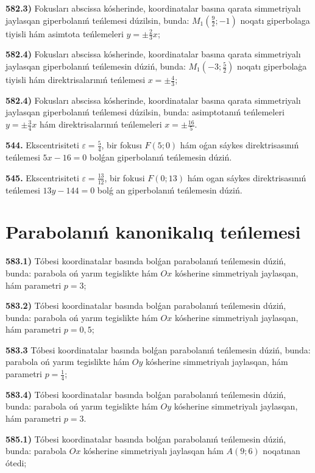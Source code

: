 \textbf{582.3)} Fokusları abscissa kósherinde, koordinatalar basına qarata simmetriyalı jaylasqan giperbolanıń teńlemesi dúzilsin, bunda: $M_1\left(\frac{9}{2};-1\right) $ noqatı giperbolaga tiyisli hám asimtota teńlemeleri $y= \pm \frac{2}{3} x$;

\textbf{582.4)} Fokusları abscissa kósherinde, koordinatalar basına qarata simmetriyalı jaylasqan giperbolanıń teńlemesin dúziń, bunda: $M_1\left(-3; \frac{5}{2}\right)$ noqatı giperbolaģa tiyisli hám direktrisalarınıń teńlemesi $x= \pm \frac{4}{3}$;

\textbf{582.4)} Fokusları abscissa kósherinde, koordinatalar basına qarata simmetriyalı jaylasqan giperbolanıń teńlemesi dúzilsin, bunda: asimptotanıń teńlemeleri $y= \pm \frac{3}{4} x$ hám direktrisalarınıń teńlemeleri $x= \pm \frac{16}{5}$.

\textbf{544.} Ekscentrisiteti $\varepsilon=\frac{5}{4}$, bir fokusı $F (5; 0) $ hám oǵan sáykes direktrisasınıń teńlemesi $5x-16=0$ bolǵan giperbolanıń teńlemesin dúziń.

\textbf{545.} Ekscentrisiteti $\varepsilon=\frac{13}{12}$, bir fokusi $F (0; 13) $ hám ogan sáykes direktrisasınıń teńlemesi $13 y-144=0$ bolǵ an giperbolanıń teńlemesin dúziń.


\section{Parabolanıń kanonikalıq teńlemesi}


\textbf{583.1)} Tóbesi koordinatalar basında bolǵan parabolanıń teńlemesin dúziń, bunda: parabola oń yarım tegislikte hám $Ox$ kósherine simmetriyalı jaylasqan, hám parametri $p=3$;

\textbf{583.2)} Tóbesi koordinatalar basında bolǵan parabolanıń teńlemesin dúziń, bunda: parabola oń yarım tegislikte hám $Ox$ kósherine simmetriyalı jaylasqan, hám parametri $p=0,5$;

\textbf{583.3} Tóbesi koordinatalar basında bolǵan parabolanıń teńlemesin dúziń, bunda: parabola oń yarım tegislikte hám $Oy$ kósherine simmetriyalı jaylasqan, hám parametri $p=\frac{1}{4}$;

\textbf{583.4)} Tóbesi koordinatalar basında bolǵan parabolanıń teńlemesin dúziń, bunda: parabola oń yarım tegislikte hám $Oy$ kósherine simmetriyalı jaylasqan, hám parametri $p=3$.

\textbf{585.1)} Tóbesi koordinatalar basında bolǵan parabolanıń teńlemesin dúziń, bunda: parabola $Ox$ kósherine simmetriyalı jaylasqan hám $A (9; 6) $ noqatınan ótedi;

